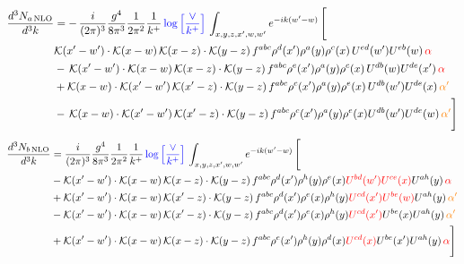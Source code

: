 \documentclass[9pt]{article}
\numberwithin{equation}{section}
\newcommand{\chg}[1]{{\color{red}#1}}
\begin{document}
\begin{align}
    \frac{d^{3}N_{a\,\rm NLO}}{d^{3}k} & = -\,\frac{i}{(2\pi)^{3}}\frac{g^{4}}{8\pi^{3}}\frac{1}{2\pi^{2}} \frac{1}{k^{+}}\,{\color{blue}\log{\left[\frac{\vee}{k^{+}}\right]}}\,\int_{x,y,z,x^{\prime},w,w^{\prime}}e^{-ik(w^{\prime}-w)}\, \Bigg[\notag \\ &  \mathcal{K}(x'-w')\cdot \mathcal{K}(x-w)\, \mathcal{K}(x-z)\cdot \mathcal{K}(y-z)\, f^{a b c} \rho^{d}(x') \rho^{a}(y) \rho^{c}(x)\,U^{ed}(w') U^{e b}(w)\,  {\color{red}\alpha} \nonumber\\
    &  -\,\mathcal{K}(x'-w')\cdot \mathcal{K}(x-w)\, \mathcal{K}(x-z)\cdot \mathcal{K}(y-z)\, f^{a b c} \rho^{e}(x') \rho^{a}(y) \rho^{c}(x)\, U^{d b}(w) U^{de}(x')\, {\color{red}\alpha} \nonumber\\
    & + \mathcal{K}(x-w)\cdot \mathcal{K}(x'-w')\, \mathcal{K}(x'-z)\cdot \mathcal{K}(y-z)\, f^{a b c} \rho^{c}(x') \rho^{a}(y) \rho^{e}(x)\,U^{d b}(w') U^{de}(x)\, {\color{orange} \alpha'} \nonumber\\
    & -\,\mathcal{K}(x-w)\cdot \mathcal{K}(x'-w')\, \mathcal{K}(x'-z)\cdot \mathcal{K}(y-z)\, f^{a b c} \rho^{c}(x') \rho^{a}(y) \rho^{e}(x) U^{db}(w') U^{de}(w)\, {\color{orange} \alpha'}\Bigg]
\end{align}
\begin{align}
      \frac{d^{3}N_{b\,\rm NLO}}{d^{3}k} & = \frac{i}{(2\pi)^{3}}\frac{g^{4}}{8\pi^{3}}\frac{1}{2\pi^{2}} \frac{1}{k^{+}}\,{\color{blue}\log{\left[\frac{\vee}{k^{+}}\right]}}\,\int_{x,y,z,x^{\prime},w,w^{\prime}}e^{-ik(w^{\prime}-w)}\, \Bigg[\notag \\ & - \mathcal{K}(x'-w')\cdot \mathcal{K}(x-w)\, \mathcal{K}(x-z)\cdot \mathcal{K}(y-z)\, f^{a b c} \rho^{d}(x') \rho^{h}(y) \rho^{e}(x) \chg{U^{bd}(w')} \chg{U^{ce}(x)} U^{a h}(y)\,{\color{red}\alpha} \nonumber\\
    &+ \mathcal{K}(x'-w')\cdot \mathcal{K}(x-w)\,\mathcal{K}(x'-z)\cdot \mathcal{K}(y-z)\, f^{a b c} \rho^{d}(x') \rho^{e}(x) \rho^{h}(y) \chg{U^{cd}(x')} \chg{U^{be}(w)} U^{a h}(y)\, {\color{orange} \alpha'}\nonumber\\
    &- \mathcal{K}(x'-w')\cdot \mathcal{K}(x-w)\,\mathcal{K}(x'-z)\cdot \mathcal{K}(y-z)\, f^{a b c} \rho^{d}(x') \rho^{e}(x) \rho^{h}(y) \chg{U^{cd}(x')} U^{b e}(x) U^{a h}(y)\, {\color{orange} \alpha'}\nonumber\\
    &+  \mathcal{K}(x'-w')\cdot \mathcal{K}(x-w)\, \mathcal{K}(x-z)\cdot \mathcal{K}(y-z)\, f^{a b c} \rho^{e}(x') \rho^{h}(y) \rho^{d}(x) \chg{U^{cd}(x)} U^{b e}(x') U^{a h}(y)\, {\color{red}\alpha}\Bigg]
\end{align}
\end{document}

